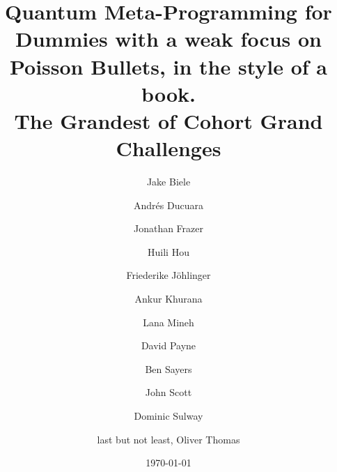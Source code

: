 \documentclass[12pt]{book}
\begin{document}

\title{\bf Quantum Meta-Programming for Dummies with a weak focus on Poisson Bullets, in the style of a book. \\ {\large The Grandest of Cohort Grand Challenges}}


\author[ ]{Jake Biele}
\author[ ]{Andrés Ducuara}
\author[ ]{Jonathan Frazer}
\author[ ]{Huili Hou}
\author[ ]{Friederike Jöhlinger}
\author[ ]{Ankur Khurana}
\author[ ]{Lana Mineh}
\author[ ]{David Payne}
\author[ ]{Ben Sayers}
\author[ ]{John Scott}
\author[ ]{Dominic Sulway}
\author[ ]{last but not least, Oliver Thomas}

\begin{comment} %
\author[ ]{J. Biele}
\author[ ]{A. Ducuara}
\author[ ]{J. Frasure}
\author[ ]{H. Hou}
\author[ ]{F. Jöhlinger}
\author[ ]{A. Khurana}
\author[ ]{L. Mineh}
\author[ ]{D. Payne}
\author[ ]{B. Sayers}
\author[ ]{J. Scott}
\author[ ]{D. Sulway}
\author[ ]{O. Thomas}

\affil[ ]{ {\small Quantum Engineering Technology Labs, H. H. Wills Physics Laboratory and \\ Department of Electrical \& Electronic Engineering, University of Bristol, BS8 1FD, UK}}
\end{comment}
\date{\today}
\maketitle





\tableofcontents

\setlength{\parskip}{0.5em}




\end{document}
